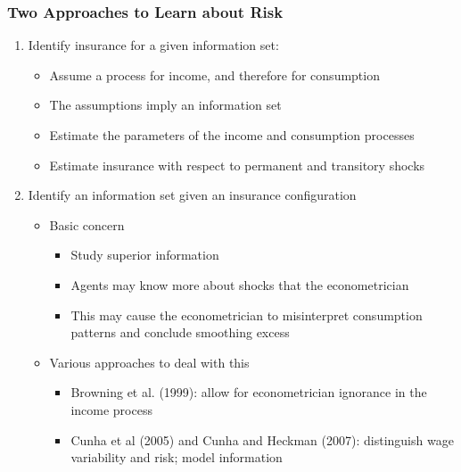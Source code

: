 \begin{frame}
		\frametitle{Two Approaches to Learn about Risk}
	\begin{enumerate}
		\item Identify insurance for a given information set:
			\begin{itemize}
				\item Assume a process for income, and therefore for consumption
				\item The assumptions imply an information set
				\item Estimate the parameters of the income and consumption processes
				\item Estimate insurance with respect to permanent and transitory shocks			
			\end{itemize}
		\item Identify an information set given an insurance configuration
			\begin{itemize}
				\item Basic concern
				\begin{itemize}
					\item Study superior information
					\item Agents may know more about shocks that the econometrician
					\item This may cause the econometrician to misinterpret consumption patterns and conclude smoothing excess
				\end{itemize}
					\item Various approaches to deal with this
						\begin{itemize}
					\item Browning et al. (1999): allow for econometrician ignorance in the income process
					\item Cunha et al (2005) and Cunha and Heckman (2007): distinguish wage variability and risk; model information
						\end{itemize}
			\end{itemize}
	\end{enumerate}
\end{frame}



